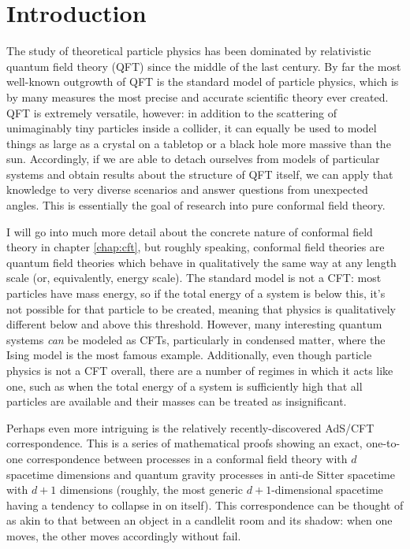 \chapter{Introduction}
\label{chap:intro}

The study of theoretical particle physics has been dominated by relativistic
quantum field theory (QFT) since the middle of the last century. By far the most 
well-known outgrowth of QFT is the standard model of particle physics, which is
by many measures the most precise and accurate scientific theory ever created.
QFT is extremely versatile, however: in addition to the scattering of 
unimaginably tiny particles inside a collider, it can equally be used to model 
things as large as a crystal on a tabletop or a black hole more massive than the
sun. Accordingly, if we are able to detach ourselves from models of particular
systems and obtain results about the structure of QFT itself, we can apply that
knowledge to very diverse scenarios and answer questions from unexpected angles.
This is essentially the goal of research into pure conformal field theory.

I will go into much more detail about the concrete nature of conformal field
theory in chapter \ref{chap:cft}, but roughly speaking, conformal field theories
are quantum field theories which behave in qualitatively the same way at any
length scale (or, equivalently, energy scale). The standard model is not a CFT:
most particles have mass energy, so if the total energy of a system is below 
this, it's not possible for that particle to be created, meaning that physics is
qualitatively different below and above this threshold. However, many 
interesting quantum systems \emph{can} be modeled as CFTs, particularly in
condensed matter, where the Ising model is the most famous example. 
Additionally, even though particle physics is not a CFT overall, there are a 
number of regimes in which it acts like one, such as when the total energy of a
system is sufficiently high that all particles are available and their masses
can be treated as insignificant.

Perhaps even more intriguing is the relatively recently-discovered AdS/CFT
correspondence. This is a series of mathematical proofs showing an exact, 
one-to-one correspondence between processes in a conformal field theory with $d$
spacetime dimensions and quantum gravity processes in anti-de Sitter spacetime
with $d+1$ dimensions (roughly, the most generic $d+1$-dimensional spacetime
having a tendency to collapse in on itself). This correspondence can be thought
of as akin to that between an object in a candlelit room and its shadow: when
one moves, the other moves accordingly without fail.

